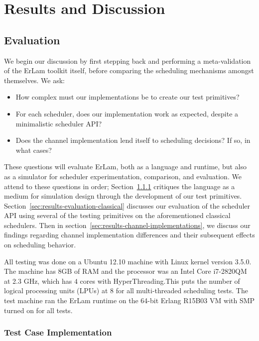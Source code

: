 \chapter{Results and Discussion}
%
\label{chap:results}

\section{Evaluation}\label{sec:results-evaluation}

We begin our discussion by first stepping back and performing a meta-validation 
of the ErLam toolkit itself, before comparing the scheduling mechanisms amongst 
themselves. We ask:
\vspace{-3mm}\begin{itemize}
    \item How complex must our implementations be to create our test primitives? 
    \item For each scheduler, does our implementation work as expected, despite a minimalistic scheduler API?
    \item Does the channel implementation lend itself to scheduling decisions? If so, in what cases?
\end{itemize}\vspace{-3mm}
These questions will evaluate ErLam, both as a language and runtime, but also as a 
simulator for scheduler experimentation, comparison, and evaluation. We attend to
these questions in order;
Section~\ref{sec:results-test-case-implementation} critiques the language as a 
medium for simulation design through the development of our test primitives.
Section~\ref{sec:results-evaluation-classical} discusses our evaluation of the
scheduler API using several of the testing primitives on the aforementioned 
classical schedulers. 
Then in section~\ref{sec:results-channel-implementations}, we discuss our findings 
regarding channel implementation differences and their subsequent effects on 
scheduling behavior.

All testing was done on a Ubuntu 12.10 machine with Linux kernel version 3.5.0.  
The machine has 8GB of RAM and the processor was an Intel Core i7-2820QM at 
2.3 GHz, which has $4$ cores with HyperThreading.This puts the number of logical 
processing units (LPUs) at $8$ for all multi-threaded scheduling tests. 
The test machine ran the ErLam runtime on the 64-bit Erlang R15B03 VM 
with SMP turned on for all tests.


\subsection{Test Case Implementation}\label{sec:results-test-case-implementation}

